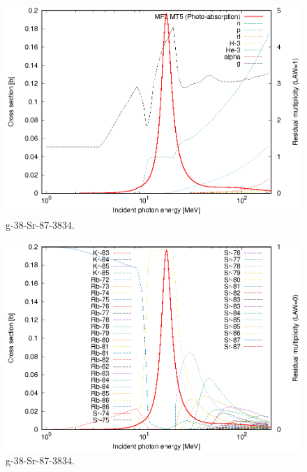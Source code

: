 \begin{figure}
 \includegraphics[width=\linewidth]{eps/g_38-Sr-87_3834.eps}
  \caption{g-38-Sr-87-3834.}
\end{figure}
\begin{figure}
 \includegraphics[width=\linewidth]{eps-law0/g_38-Sr-87_3834.eps}
 \caption{g-38-Sr-87-3834.}
\end{figure}
\newpage \clearpage

